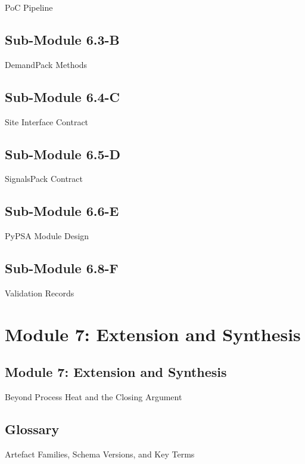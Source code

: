 \documentclass[
  11pt,
  a4paper,
  twoside,
  openright]{scrbook}
\begin{document}
PoC Pipeline

\hfill\break

\chapter{Sub-Module 6.3-B}\label{sub-module-6.3-b}

DemandPack Methods

\hfill\break

\chapter{Sub-Module 6.4-C}\label{sub-module-6.4-c}

Site Interface Contract

\hfill\break

\chapter{Sub-Module 6.5-D}\label{sub-module-6.5-d}

SignalsPack Contract

\hfill\break

\chapter{Sub-Module 6.6-E}\label{sub-module-6.6-e}

PyPSA Module Design

\hfill\break

\chapter{Sub-Module 6.8-F}\label{sub-module-6.8-f}

Validation Records

\hfill\break

\part{Module 7: Extension and Synthesis}

\chapter{Module 7: Extension and
Synthesis}\label{module-7-extension-and-synthesis-1}

Beyond Process Heat and the Closing Argument

\hfill\break


\chapter{Glossary}\label{glossary}

Artefact Families, Schema Versions, and Key Terms

\hfill\break


\backmatter
\end{document}
